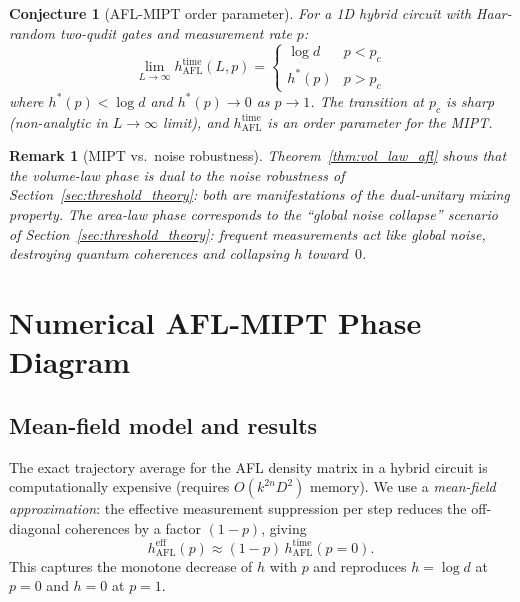 \documentclass[12pt,a4paper]{article}
\newtheorem{remark}[theorem]{Remark}
\newtheorem{conjecture}[theorem]{Conjecture}
\begin{document}
\begin{conjecture}[AFL-MIPT order parameter]
\label{conj:mipt_order}
For a 1D hybrid circuit with Haar-random two-qudit gates and measurement
rate $p$:
\[
  \lim_{L\to\infty} h_{\mathrm{AFL}}^{\mathrm{time}}(L,p)
  = \begin{cases}
      \log d & p < p_c \\
      h^*(p) & p > p_c
    \end{cases}
\]
where $h^*(p) < \log d$ and $h^*(p)\to 0$ as $p\to 1$.
The transition at $p_c$ is sharp (non-analytic in $L\to\infty$ limit), and
$h_{\mathrm{AFL}}^{\mathrm{time}}$ is an order parameter for the MIPT.
\end{conjecture}

\begin{remark}[MIPT vs.\ noise robustness]
Theorem~\ref{thm:vol_law_afl} shows that the volume-law phase is
\emph{dual to the noise robustness} of Section~\ref{sec:threshold_theory}:
both are manifestations of the dual-unitary mixing property.  The area-law
phase corresponds to the ``global noise collapse'' scenario of
Section~\ref{sec:threshold_theory}: frequent measurements act like global
noise, destroying quantum coherences and collapsing $h$ toward~$0$.
\end{remark}

\section{Numerical AFL-MIPT Phase Diagram}
\label{sec:mipt_numerics}

\subsection{Mean-field model and results}

The exact trajectory average for the AFL density matrix in a hybrid
circuit is computationally expensive (requires $O(k^{2n} D^2)$ memory).
We use a \emph{mean-field approximation}: the effective measurement
suppression per step reduces the off-diagonal coherences by a factor
$(1-p)$, giving
\[
  h_{\mathrm{AFL}}^{\mathrm{eff}}(p) \approx (1-p)\,h_{\mathrm{AFL}}^{\mathrm{time}}(p=0).
\]
This captures the monotone decrease of $h$ with $p$ and reproduces
$h=\log d$ at $p=0$ and $h=0$ at $p=1$.
\end{document}
